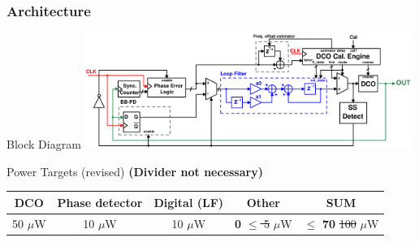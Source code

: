 \documentclass[t, screen, aspectratio=43]{beamer}
\begin{document}
\begin{frame}
	\frametitle{Architecture}
	\begin{block}{Block Diagram}
	\center\includegraphics[width=0.8\textwidth, angle=0]{pll_master_arch_28feb2020}

	\end{block}
		\begin{block}{Power Targets {\color{red}(revised)}}
		\scriptsize
		{\color{red}\textbf{(Divider not necessary)}}
		\vspace{-1em}
		\begin{table}[htb!]
			\tiny
			\centering
			\def\arraystretch{1.5}		
			\setlength\arrayrulewidth{0.75pt}
			\setlength{\tabcolsep}{1em} %
			\begin{tabular}{|c|c|c|c|c|}
				\hline 
				\rule[-1ex]{0pt}{2.5ex} \cellcolor{gray!40}\textbf{DCO} & \cellcolor{gray!40}\textbf{Phase detector} & \cellcolor{gray!40}\textbf{Digital (LF)}& \cellcolor{gray!40}\textbf{Other} & \cellcolor{gray!40}\textbf{SUM} \\ 
				\hline 
				\rule[-1ex]{0pt}{2.5ex} 50 $\mu$W& 10 $\mu$W &  10 $\mu$W  & \textbf{0} {\color{red}\st{$\leq$ 5}} $ \mu$W & $\leq$ \textbf{70} {\color{red}\st{100}} $\mu$W\\ 
				\hline 
			\end{tabular} 
		\end{table}   
	\end{block}

\end{frame}

\end{document}
